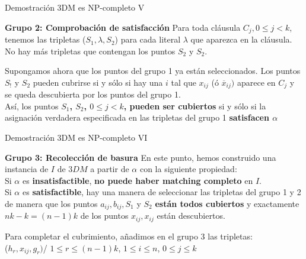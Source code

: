 \documentclass[10pt, mathserif, profesionalfont]{beamer}
\begin{document}
	
	\begin{frame}{Demostración 3DM es NP-completo V}
		
		\begin{block}{\textbf{Grupo 2: Comprobación de satisfacción}}
			Para toda cláusula $C_j, 0 \leq j < k$, tenemos las tripletas ($S_1, \lambda, S_2$) para cada literal $\lambda$ que 
			aparezca en la cláusula.
			No hay más tripletas que contengan los puntos $S_2$ y $S_2$. \\ 
			
		\end{block}
		\begin{block}{}
			
			Supongamos ahora que los puntos del grupo 1 ya están seleccionados.
			Los puntos $S_!$ y $S_2$ pueden cubrirse si y sólo si hay una $i$ tal que $x_{ij}$  (ó $\overline x_{ij})$ aparece en 
			$C_j$ y se queda descubierta por los puntos del grupo 1. 
			\\Así, los puntos \textbf{$S_1$, $S_2$, $0 \leq j < k$, 
				pueden ser cubiertos} si y sólo si la asignación verdadera especificada en las tripletas del grupo 1 \textbf{satisfacen $\alpha$}
			
		\end{block}
	\end{frame}
	
	
	\begin{frame}{Demostración 3DM es NP-completo VI}
		
		\begin{block}{\textbf{Grupo 3: Recolección de basura}}
			En este punto, hemos construido una instancia de $I$ de $3DM$ a partir de $\alpha$ con la siguiente propiedad: 
			\\Si $\alpha$ es \textbf{insatisfactible}, \textbf{no puede haber matching completo} en $I$. 
			\\Si $\alpha$ es \textbf{satisfactible}, hay una manera de seleccionar las tripletas del grupo 1 y 2 de manera que los puntos 
			$a_{ij}, b_{ij} , S_1$ y $S_2$	\textbf{están todos cubiertos} y exactamente $nk - k = (n-1) k$ de los puntos $x_{ij}, x_{ij}$
			están descubiertos.	
			
		\end{block}
		
		\begin{block}{}
			Para completar el cubrimiento, añadimos en el grupo 3 las tripletas: \\
			{($h_r, x_{ij}, g_r)$/ $1 \leq r \leq (n-1)k$, $1 \leq i \leq n$, $0 \leq j \leq k$}
		\end{block}
	\end{frame}
	
\end{document}
